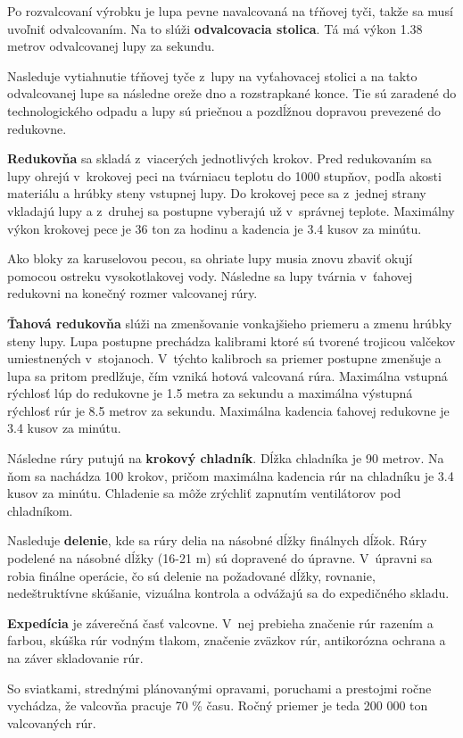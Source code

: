 \documentclass[]{article}
\begin{document}
Po rozvalcovaní výrobku je lupa pevne navalcovaná na tŕňovej tyči, takže sa musí uvoľniť odvalcovaním. Na to slúži \textbf{odvalcovacia stolica}. Tá má výkon 1.38 metrov odvalcovanej lupy za sekundu.

Nasleduje vytiahnutie tŕňovej tyče z~lupy na vyťahovacej stolici a na takto odvalcovanej lupe sa následne oreže dno a rozstrapkané konce. Tie sú zaradené do technologického odpadu a lupy sú priečnou a pozdĺžnou dopravou prevezené do redukovne.

\textbf{Redukovňa} sa skladá z~viacerých jednotlivých krokov. Pred redukovaním sa lupy ohrejú v~krokovej peci na tvárniacu teplotu do 1000 stupňov, podľa akosti materiálu a hrúbky steny vstupnej lupy.  Do krokovej pece sa z~jednej strany vkladajú lupy a z~druhej sa postupne vyberajú už v~správnej teplote. Maximálny výkon krokovej pece je 36 ton za hodinu a kadencia  je 3.4 kusov za minútu.

Ako bloky za karuselovou pecou, sa ohriate lupy musia znovu zbaviť okují pomocou ostreku vysokotlakovej vody. Následne sa lupy tvárnia v~ťahovej redukovni na konečný rozmer valcovanej rúry.

\textbf{Ťahová redukovňa} slúži na zmenšovanie vonkajšieho priemeru a zmenu hrúbky steny lupy. Lupa postupne prechádza kalibrami ktoré sú tvorené trojicou valčekov umiestnených v~stojanoch. V~týchto kalibroch sa priemer postupne zmenšuje a lupa sa pritom predlžuje, čím vzniká hotová valcovaná rúra. Maximálna vstupná rýchlosť lúp do redukovne je 1.5 metra za sekundu a maximálna výstupná rýchlosť rúr je 8.5 metrov za sekundu. Maximálna kadencia ťahovej redukovne je 3.4 kusov za minútu.

Následne rúry putujú na \textbf{krokový chladník}. Dĺžka chladníka je 90 metrov. Na ňom sa nachádza 100 krokov, pričom maximálna kadencia rúr na chladníku je 3.4 kusov za minútu. Chladenie sa môže zrýchliť zapnutím ventilátorov pod chladníkom.

Nasleduje \textbf{delenie}, kde sa rúry delia na násobné dĺžky finálnych dĺžok. Rúry podelené na násobné dĺžky (16-21 m) sú dopravené do úpravne. V~úpravni sa robia finálne operácie, čo sú delenie na požadované dĺžky, rovnanie, nedeštruktívne skúšanie, vizuálna kontrola a odvážajú sa do expedičného skladu.

\textbf{Expedícia} je záverečná časť valcovne. V~nej prebieha značenie rúr razením a farbou, skúška rúr vodným tlakom, značenie zväzkov rúr, antikorózna ochrana a na záver skladovanie rúr.

So sviatkami, strednými plánovanými opravami, poruchami a prestojmi ročne vychádza, že valcovňa pracuje 70 \% času. Ročný priemer je teda 200 000 ton valcovaných rúr.
\end{document}
